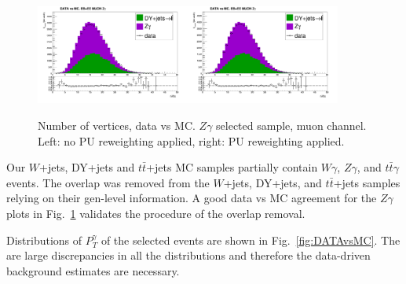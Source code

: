 \begin{figure}[htb]
  \begin{center}
   \includegraphics[width=0.45\textwidth]{../figs/figs_v11/MUON_ZGamma/PrepareYields/c_TotalDATAvsMC_EtaCommon__nVtx_noPU.png}\includegraphics[width=0.45\textwidth]{../figs/figs_v11/MUON_ZGamma/PrepareYields/c_TotalDATAvsMC_EtaCommon__nVtx.png}
  \caption{Number of vertices, data vs MC. $Z\gamma$ selected sample, muon channel. Left: no PU reweighting applied, right: PU reweighting applied. }
  \label{fig:DATAvsMC_nVtx}
  \end{center}
\end{figure}

Our $W$+jets, DY+jets and $t\bar{t}$+jets MC samples partially contain $W\gamma$, $Z\gamma$, and $t\bar{t}\gamma$ events. The overlap was removed from the $W$+jets, DY+jets, and $t\bar{t}$+jets samples relying on their gen-level information. A good data vs MC agreement for the $Z\gamma$ plots in Fig.~\ref{fig:DATAvsMC_nVtx} validates the procedure of the overlap removal.

Distributions of $P_T^{\gamma}$ of the selected events are shown in Fig.~\ref{fig:DATAvsMC}. The are large discrepancies in all the distributions and therefore the data-driven background estimates are necessary.

